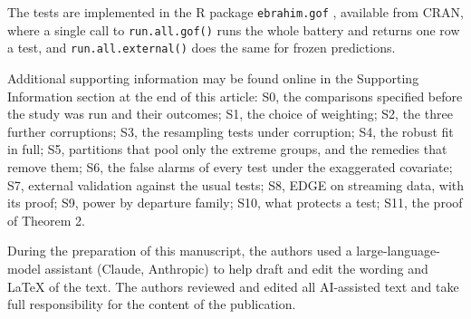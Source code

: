 \documentclass[ASNA]{USG}
\begin{document}
The tests are implemented in the R package \texttt{ebrahim.gof} \citep{ebrahim2025gof}, available from
CRAN, where a single call to \texttt{run.all.gof()} runs the whole battery and returns one row a test,
and \texttt{run.all.external()} does the same for frozen predictions.

Additional supporting information may be found online in the Supporting Information section at the
end of this article: S0, the comparisons specified before the study was run and their outcomes; S1,
the choice of weighting; S2, the three further corruptions; S3, the resampling tests under
corruption; S4, the robust fit in full; S5, partitions that pool only the extreme groups, and the
remedies that remove them; S6, the false alarms of every test under the exaggerated covariate;
S7, external validation against the usual tests; S8, EDGE on streaming data, with its proof; S9, power by departure family; S10, what
protects a test; S11, the proof of Theorem 2.

During the preparation of this manuscript, the authors used a large-language-model assistant
(Claude, Anthropic) to help draft and edit the wording and \LaTeX{} of the text. The authors
reviewed and edited all AI-assisted text and take full responsibility for the content of the
publication.


\end{document}
